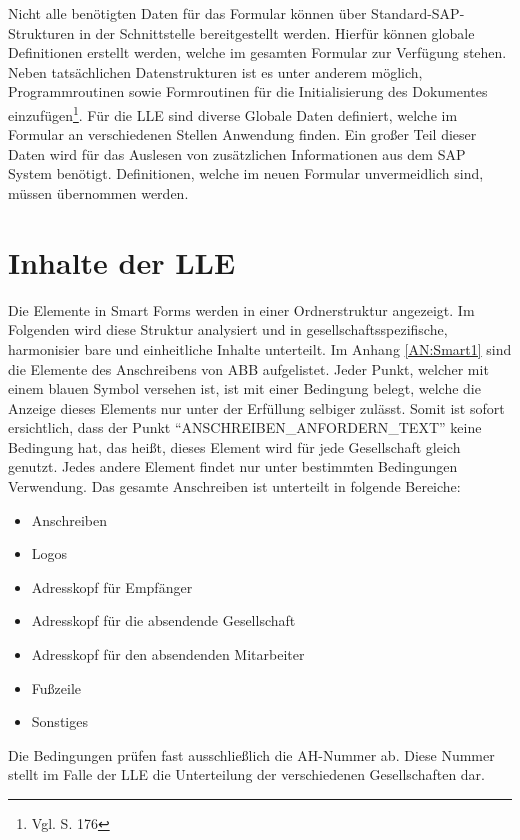 	Nicht alle benötigten Daten für das Formular können über Standard-SAP-Strukturen in der Schnittstelle bereitgestellt werden. Hierfür können globale Definitionen erstellt werden, welche im gesamten Formular zur Verfügung stehen. Neben tatsächlichen Datenstrukturen ist es unter anderem möglich, Programmroutinen sowie Formroutinen für die Initialisierung des Dokumentes einzufügen\footnote{Vgl. \cite{Hertleif.2003} S. 176}. Für die \ac{LLE} sind diverse Globale Daten definiert, welche im Formular an verschiedenen Stellen Anwendung finden. Ein großer Teil dieser Daten wird für das Auslesen von zusätzlichen Informationen aus dem SAP System benötigt. Definitionen, welche im neuen Formular unvermeidlich sind, müssen übernommen werden.
	
	
	\section{Inhalte der \acs{LLE}}
	
	Die Elemente in Smart Forms werden in einer Ordnerstruktur angezeigt. Im Folgenden wird diese Struktur analysiert und in gesellschaftsspezifische, harmonisier bare und einheitliche Inhalte unterteilt.
	Im Anhang \ref{AN:Smart1} sind die Elemente des Anschreibens von ABB aufgelistet. Jeder Punkt, welcher mit einem blauen Symbol versehen ist, ist mit einer Bedingung belegt, welche die Anzeige dieses Elements nur unter der Erfüllung selbiger zulässt. Somit ist sofort ersichtlich, dass der Punkt "`ANSCHREIBEN\_ANFORDERN\_TEXT"' keine Bedingung hat, das heißt, dieses Element wird für jede Gesellschaft gleich genutzt. Jedes andere Element findet nur unter bestimmten Bedingungen Verwendung. Das gesamte Anschreiben ist unterteilt in folgende Bereiche:
	
	\begin{itemize}
		\item Anschreiben
		\item Logos
		\item Adresskopf für Empfänger
		\item Adresskopf für die absendende Gesellschaft
		\item Adresskopf für den absendenden Mitarbeiter
		\item Fußzeile
		\item Sonstiges
	\end{itemize}

	Die Bedingungen prüfen fast ausschließlich die \ac{AH}-Nummer ab. Diese Nummer stellt im Falle der \ac{LLE} die Unterteilung der verschiedenen Gesellschaften dar.
\FloatBarrier


